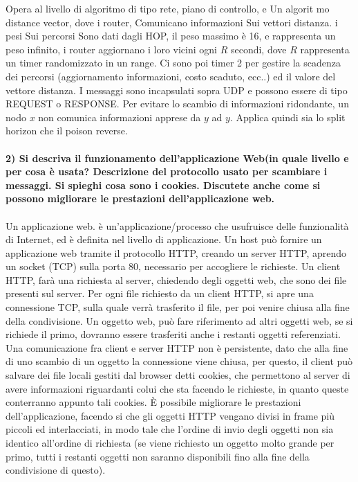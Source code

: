 \documentclass[12pt, letterpaper]{article}
\newcommand{\acc}{\\\hphantom{}\\}
\begin{document}
 Opera al livello di algoritmo di tipo rete, piano di controllo, e Un algorit mo distance vector, dove i router,
 Comunicano informazioni Sui vettori distanza. i pesi Sui percorsi Sono dati dagli HOP, il peso massimo è 16,
  e rappresenta un peso infinito, i router aggiornano i loro vicini ogni $R$ secondi, dove $R$ rappresenta un timer
   randomizzato in un range. Ci sono poi timer 2  per gestire la scadenza dei percorsi (aggiornamento informazioni,
    costo scaduto, ecc..) ed il valore del vettore distanza. 
    I messaggi sono incapsulati sopra UDP e possono essere di tipo REQUEST o RESPONSE.
    Per evitare lo scambio di informazioni ridondante, un nodo $x$ non comunica informazioni apprese da $y$ ad $y$. Applica quindi sia lo split 
    horizon che il poison reverse.\acc


 \textbf{2) Si descriva il funzionamento dell'applicazione Web(in quale livello e per cosa è usata?
  Descrizione del protocollo usato per scambiare i messaggi. Si spieghi cosa sono i cookies. Discutete 
  anche come si possono migliorare le prestazioni dell'applicazione web.}\acc 
Un applicazione web. è un'applicazione/processo che usufruisce delle funzionalità di Internet, ed è definita 
nel livello di applicazione. Un host può fornire un applicazione web tramite il protocollo HTTP, creando un 
server HTTP, aprendo un socket (TCP) sulla porta 80, necessario per accogliere le richieste. Un client HTTP, 
farà una richiesta al server, chiedendo degli oggetti web, che sono dei file presenti sul server. Per ogni file richiesto 
da un client HTTP, si apre una connessione TCP, sulla quale verrà trasferito il file, per poi venire chiusa alla fine della 
condivisione. Un oggetto web, può fare riferimento ad altri oggetti web, se si richiede il primo, dovranno essere 
trasferiti anche i restanti oggetti referenziati. Una comunicazione fra client e server HTTP non è persistente, dato 
che alla fine di uno scambio di un oggetto la connessione viene chiusa, per questo, il client può salvare dei file 
locali gestiti dal browser detti cookies, che permettono al server di avere informazioni riguardanti colui 
che sta facendo le richieste, in quanto queste conterranno appunto tali cookies. 
È possibile migliorare le prestazioni dell'applicazione, facendo si che gli oggetti HTTP vengano divisi in frame 
più piccoli ed interlacciati, in modo tale che l'ordine di invio degli oggetti non sia identico all'ordine di 
richiesta (se viene richiesto un oggetto molto grande per primo, tutti i restanti oggetti non saranno disponibili
fino alla fine della condivisione di questo).  
\end{document}
